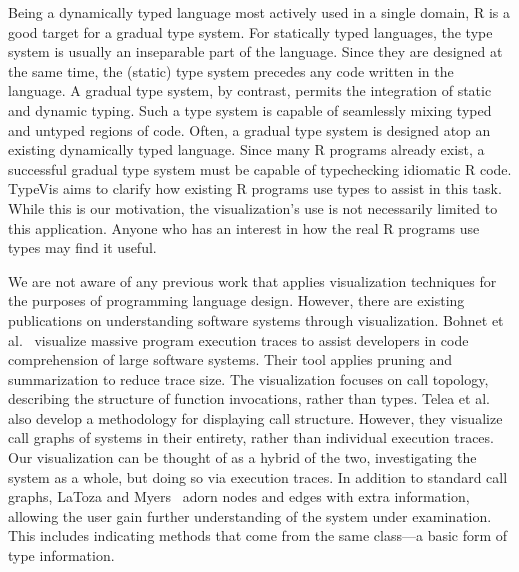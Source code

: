 \documentclass{vgtc}                          %
\newcommand{\typevis}{{\sc TypeVis}\xspace}
\begin{document}
Being a dynamically typed language most actively used in a single domain,
R is a good target for a gradual type system.
For statically typed languages, the type system is usually
an inseparable part of the language. Since they are designed
at the same time, the (static) type system precedes any code written
in the language.
A gradual type system, by contrast,
permits the integration of static and dynamic typing.
Such a type system is capable of seamlessly mixing typed and untyped regions of code.
Often, a gradual type system is designed atop
an existing dynamically typed language.
Since many R programs already exist,
a successful gradual type system must be capable of
typechecking idiomatic R code.
\typevis aims to clarify how existing R programs
use types to assist in this task.
While this is our motivation, the visualization's use
is not necessarily limited to this application.
Anyone who has an interest in how the real R programs use types
may find it useful.

We are not aware of any previous work that applies
visualization techniques for the purposes of programming language design.
However, there are existing publications on understanding
software systems through visualization.
Bohnet et al.~\cite{bohnet:2009} visualize massive program execution traces
to assist developers in code comprehension of large software systems.
Their tool applies pruning and summarization to reduce trace size.
The visualization focuses on call topology,
describing the structure of function invocations,
rather than types.
Telea et al.~\cite{telea:2009} also develop a methodology for displaying call structure.
However, they visualize call graphs of systems in their entirety,
rather than individual execution traces.
Our visualization can be thought of as a hybrid of the two,
investigating the system as a whole,
but doing so via execution traces.
In addition to standard call graphs,
LaToza and Myers~\cite{latoza:2011} adorn nodes and edges with extra information,
allowing the user gain further understanding of the system
under examination.
This includes indicating methods that come from the same class---a
basic form of type information.

\end{document}

